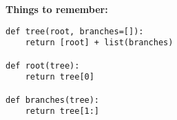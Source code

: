 \textbf{Things to remember:}

\begin{lstlisting}
def tree(root, branches=[]):
    return [root] + list(branches)

def root(tree):
    return tree[0]

def branches(tree):
    return tree[1:]

\end{lstlisting}

